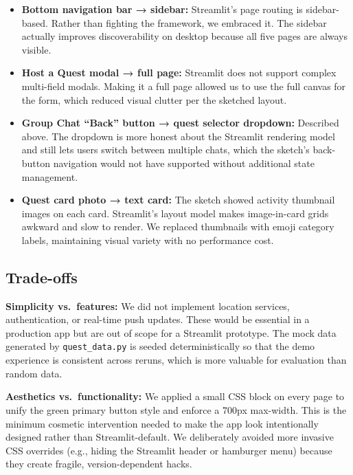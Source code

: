 \documentclass[11pt]{article}
\begin{document}
\begin{itemize}
    \item \textbf{Bottom navigation bar → sidebar:} Streamlit's page routing is sidebar-based. Rather than fighting the framework, we embraced it. The sidebar actually improves discoverability on desktop because all five pages are always visible.
    \item \textbf{Host a Quest modal → full page:} Streamlit does not support complex multi-field modals. Making it a full page allowed us to use the full canvas for the form, which reduced visual clutter per the sketched layout.
    \item \textbf{Group Chat ``Back'' button → quest selector dropdown:} Described above. The dropdown is more honest about the Streamlit rendering model and still lets users switch between multiple chats, which the sketch's back-button navigation would not have supported without additional state management.
    \item \textbf{Quest card photo → text card:} The sketch showed activity thumbnail images on each card. Streamlit's layout model makes image-in-card grids awkward and slow to render. We replaced thumbnails with emoji category labels, maintaining visual variety with no performance cost.
\end{itemize}

\subsection{Trade-offs}

\textbf{Simplicity vs.\ features:} We did not implement location services, authentication, or real-time push updates. These would be essential in a production app but are out of scope for a Streamlit prototype. The mock data generated by \texttt{quest\_data.py} is seeded deterministically so that the demo experience is consistent across reruns, which is more valuable for evaluation than random data.

\textbf{Aesthetics vs.\ functionality:} We applied a small CSS block on every page to unify the green primary button style and enforce a 700px max-width. This is the minimum cosmetic intervention needed to make the app look intentionally designed rather than Streamlit-default. We deliberately avoided more invasive CSS overrides (e.g., hiding the Streamlit header or hamburger menu) because they create fragile, version-dependent hacks.

\end{document}
